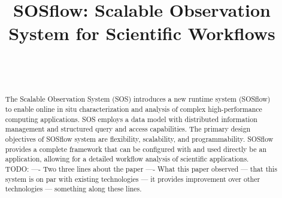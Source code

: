 
\title{SOSflow: Scalable Observation System for Scientific Workflows}

\author{
        \\
        \\
}

\maketitle



\begin{abstract} %
The Scalable Observation System (SOS) introduces a new runtime system
(SOSflow) to enable online in situ characterization and analysis of
complex high-performance computing applications.
%
SOS employs a data model with distributed information management and
structured query and access capabilities.
%
The primary design objectives of SOSflow system are flexibility,
scalability, and programmability.
%
SOSflow provides a complete framework that can be configured with and
used directly be an application, allowing for a detailed workflow
analysis of scientific applications.
%
\\
%
    TODO: ---- Two three lines about the paper ---- What this paper observed ---
     that this system is on par with existing technologies --- it
     provides improvement over other technologies --- something along
     these lines.
%


\end{abstract}


